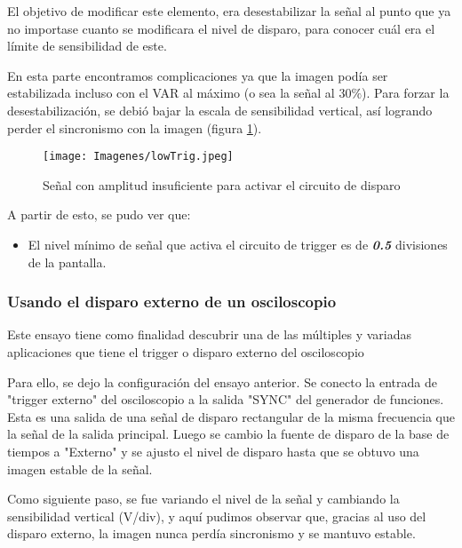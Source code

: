  El objetivo de modificar este elemento, era desestabilizar la señal al punto que ya no importase cuanto se modificara el nivel de disparo, para conocer cuál era el límite de sensibilidad de este. 

En esta parte encontramos complicaciones ya que la imagen podía ser estabilizada incluso con el VAR al máximo (o sea la señal al $30\%$). Para forzar la desestabilización, se debió bajar la escala de sensibilidad vertical, así logrando perder el sincronismo con la imagen (figura \ref{fig:desinc}).


\begin{figure}[H]
    \centering
    \texttt{[image: Imagenes/lowTrig.jpeg]}
    \caption{Señal con amplitud insuficiente para activar el circuito de disparo}
    \label{fig:desinc}
\end{figure}

A partir de esto, se pudo ver que:

\begin{itemize}
    \item El nivel mínimo de señal que activa el circuito de trigger es de \textit{\textbf{0.5}} divisiones de la pantalla.
\end{itemize}

\vspace{0.5cm}
\subsubsection{Usando el disparo externo de un osciloscopio}

Este ensayo tiene como finalidad descubrir una de las múltiples y variadas aplicaciones que tiene el trigger o disparo externo del osciloscopio 

Para ello, se dejo la configuración del ensayo anterior. Se conecto la entrada de "trigger externo" del osciloscopio a la salida "SYNC" del generador de funciones. Esta es una salida de una señal de disparo rectangular de la misma frecuencia que la señal de la salida principal. Luego se cambio la fuente de disparo de la base de tiempos a "Externo" y se ajusto el nivel de disparo hasta que se obtuvo una imagen estable de la señal.

Como siguiente paso, se fue variando el nivel de la señal y cambiando la sensibilidad vertical (V/div), y aquí pudimos observar que, gracias al uso del disparo externo, la imagen nunca perdía sincronismo y se mantuvo estable.

